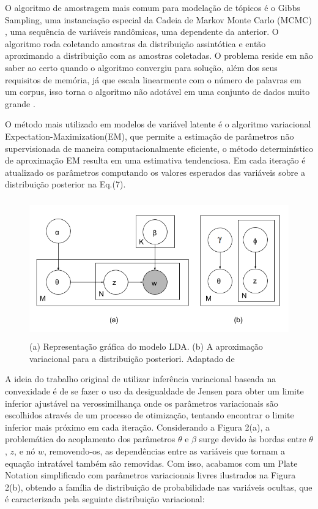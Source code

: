 \documentclass[12pt,a4paper]{article}
\begin{document}
  O algoritmo de amostragem mais comum para modelação de tópicos é o Gibbs Sampling, uma instanciação especial da Cadeia de Markov Monte Carlo (MCMC) \cite{jordan1999introduction},
   uma sequência de variáveis randômicas, uma dependente da anterior. O algoritmo roda coletando amostras da distribuição assintótica e então aproximando a distribuição com as amostras coletadas.
   O problema reside em não saber ao certo  quando o algoritmo convergiu para solução, além dos seus requisitos de memória, já que escala linearmente com o número de palavras em um corpus,
   isso torna o algoritmo não adotável em uma conjunto de dados muito grande \cite{vrehuuvrek2011scalability}.
  
  O método mais utilizado em modelos de variável latente é o algoritmo variacional Expectation-Maximization(EM), que permite a estimação de parâmetros não supervisionada de maneira computacionalmente eficiente,
   o método determinístico de aproximação EM resulta em uma estimativa tendenciosa. Em cada iteração é atualizado os parâmetros computando os valores esperados das variáveis sobre a distribuição posterior na Eq.(7).
  
  
  \begin{figure}[H]
    \centering
      \includegraphics[height=6cm]{images/figure_2.png}
      \caption{(a) Representação gráfica do modelo LDA. (b) A aproximação variacional para a distribuição posteriori. Adaptado de }
  \end{figure}
  
  A ideia do trabalho original de utilizar inferência variacional baseada na convexidade é de se fazer o uso da desigualdade de Jensen para obter um limite inferior ajustável na verossimilhança \cite{jordan1999introduction} onde os parâmetros variacionais são escolhidos através de um processo de otimização,
   tentando encontrar o limite inferior mais próximo em cada iteração. Considerando a Figura 2(a), a problemática do acoplamento dos parâmetros $\theta$ e $\beta$ surge devido às bordas entre $\theta$, $z$,
   e nó $w$, removendo-os, as dependências entre as variáveis que tornam a equação intratável também são removidas. Com isso,
   acabamos com um Plate Notation simplificado com parâmetros variacionais livres ilustrados na Figura 2(b), obtendo a família de distribuição de probabilidade nas variáveis ocultas,
   que é caracterizada pela seguinte distribuição variacional:
  
\end{document}
